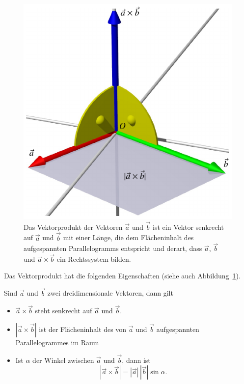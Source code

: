 \begin{figure}
\centering
\includegraphics{5/images/vektorprodukt.pdf}
\caption{Das Vektorprodukt der Vektoren $\vec{a}$ und $\vec{b}$ ist ein Vektor
senkrecht auf $\vec{a}$ und $\vec{b}$ mit einer Länge, die dem 
Flächeninhalt des aufgespannten Parallelogramms entspricht und derart,
dass $\vec{a}$, $\vec{b}$ und $\vec{a}\times\vec{b}$ ein Rechtssystem
bilden.
\label{skript:vektorprodukt}}
\end{figure}
Das Vektorprodukt hat die folgenden Eigenschaften (siehe auch
Abbildung~\ref{skript:vektorprodukt}).
\begin{satz}
Sind $\vec a$ und $\vec b$ zwei dreidimensionale Vektoren, dann gilt
\begin{itemize}
\item $\vec a\times\vec b$ steht senkrecht auf $\vec a$ und $\vec b$.
\item $|\vec a\times\vec b|$ ist der Flächeninhalt des von
$\vec a$ und $\vec b$ aufgespannten Parallelogrammes im Raum
\item Ist $\alpha$ der Winkel zwischen $\vec a$ und $\vec b$, dann
ist
\[
|\vec a\times\vec b|=|\vec a|\,|\vec b|\sin \alpha.
\]
\end{itemize}
\end{satz}
